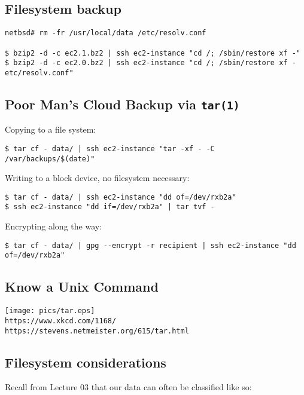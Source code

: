 \documentclass[xga]{xdvislides}
\begin{document}
\subsection{Filesystem backup}
\smallish
\begin{verbatim}
netbsd# rm -fr /usr/local/data /etc/resolv.conf

$ bzip2 -d -c ec2.1.bz2 | ssh ec2-instance "cd /; /sbin/restore xf -"
$ bzip2 -d -c ec2.0.bz2 | ssh ec2-instance "cd /; /sbin/restore xf - etc/resolv.conf"
\end{verbatim}


\subsection{Poor Man's Cloud Backup via {\tt tar(1)}}
Copying to a file system:
\begin{verbatim}
$ tar cf - data/ | ssh ec2-instance "tar -xf - -C /var/backups/$(date)"
\end{verbatim}

\vspace{.5in}
Writing to a block device, no filesystem necessary:
\begin{verbatim}
$ tar cf - data/ | ssh ec2-instance "dd of=/dev/rxb2a"
$ ssh ec2-instance "dd if=/dev/rxb2a" | tar tvf -
\end{verbatim}

\vspace{.5in}
Encrypting along the way:
\begin{verbatim}
$ tar cf - data/ | gpg --encrypt -r recipient | ssh ec2-instance "dd of=/dev/rxb2a"
\end{verbatim}

\subsection{Know a Unix Command}
\vspace*{\fill}
\begin{center}
	\texttt{[image: pics/tar.eps]} \\
	\verb+https://www.xkcd.com/1168/+ \\
	\verb+https://stevens.netmeister.org/615/tar.html+
\end{center}
\vspace*{\fill}

\subsection{Filesystem considerations}
Recall from Lecture 03 that our data can often be
classified like so: \\
\end{document}
